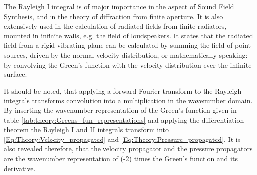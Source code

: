 The Rayleigh I integral is of major importance in the aspect of Sound Field Synthesis, and in the theory of diffraction from finite aperture. It is also extensively used in the calculation of radiated fields from finite radiators, mounted in infinite walls, e.g. the field of loudspeakers. It states that the radiated field from a rigid vibrating plane can be calculated by summing the field of point sources, driven by the normal velocity distribution, or mathematically speaking: by convolving the Green's function with the velocity distribution over the infinite surface.

It should be noted, that applying a forward Fourier-transform to the Rayleigh integrals transforms convolution into a multiplication in the wavenumber domain. By inserting the wavenumber representation of the Green's function given in table \ref{tab:theory:Greens_fun_representations}  and applying the differentiation theorem the Rayleigh I and II integrals transform into \eqref{Eq:Theory:Velocity_propagated} and \eqref{Eq:Theory:Pressure_propagated}. It is also revealed therefore, that the velocity propagator and the pressure propagators are the wavenumber representation of (-2) times the Green's function and its derivative.